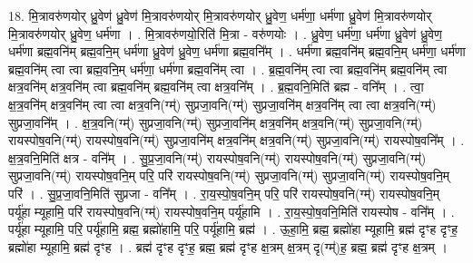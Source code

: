 \documentclass[17pt]{extarticle}
\begin{document}
18. मि॒त्रावरु॑णयोर् ध्रु॒वेण॑ ध्रु॒वेण॑ मि॒त्रावरु॑णयोर् मि॒त्रावरु॑णयोर् ध्रु॒वेण॒ धर्म॑णा॒ धर्म॑णा ध्रु॒वेण॑ मि॒त्रावरु॑णयोर् मि॒त्रावरु॑णयोर् ध्रु॒वेण॒ धर्म॑णा । . मि॒त्रावरु॑णयो॒रिति॑ मि॒त्रा - वरु॑णयोः । . ध्रु॒वेण॒ धर्म॑णा॒ धर्म॑णा ध्रु॒वेण॑ ध्रु॒वेण॒ धर्म॑णा ब्रह्म॒वनि॑म् ब्रह्म॒वनि॒म् धर्म॑णा ध्रु॒वेण॑ ध्रु॒वेण॒ धर्म॑णा ब्रह्म॒वनि᳚म् । . धर्म॑णा ब्रह्म॒वनि॑म् ब्रह्म॒वनि॒म् धर्म॑णा॒ धर्म॑णा ब्रह्म॒वनि॑म् त्वा त्वा ब्रह्म॒वनि॒म् धर्म॑णा॒ धर्म॑णा ब्रह्म॒वनि॑म् त्वा । . ब्र॒ह्म॒वनि॑म् त्वा त्वा ब्रह्म॒वनि॑म् ब्रह्म॒वनि॑म् त्वा क्षत्र॒वनि॑म् क्षत्र॒वनि॑म् त्वा ब्रह्म॒वनि॑म् ब्रह्म॒वनि॑म् त्वा क्षत्र॒वनि᳚म् । . ब्र॒ह्म॒वनि॒मिति॑ ब्रह्म - वनि᳚म् । . त्वा॒ क्ष॒त्र॒वनि॑म् क्षत्र॒वनि॑म् त्वा त्वा क्षत्र॒वनि(ग्म्॑) सुप्रजा॒वनि(ग्म्॑) सुप्रजा॒वनि॑म् क्षत्र॒वनि॑म् त्वा त्वा क्षत्र॒वनि(ग्म्॑) सुप्रजा॒वनि᳚म् । . क्ष॒त्र॒वनि(ग्म्॑) सुप्रजा॒वनि(ग्म्॑) सुप्रजा॒वनि॑म् क्षत्र॒वनि॑म् क्षत्र॒वनि(ग्म्॑) सुप्रजा॒वनि(ग्म्॑) रायस्पोष॒वनि(ग्म्॑) रायस्पोष॒वनि(ग्म्॑) सुप्रजा॒वनि॑म् क्षत्र॒वनि॑म् क्षत्र॒वनि(ग्म्॑) सुप्रजा॒वनि(ग्म्॑) रायस्पोष॒वनि᳚म् । . क्ष॒त्र॒वनि॒मिति॑ क्षत्र - वनि᳚म् । . सु॒प्र॒जा॒वनि(ग्म्॑) रायस्पोष॒वनि(ग्म्॑) रायस्पोष॒वनि(ग्म्॑) सुप्रजा॒वनि(ग्म्॑) सुप्रजा॒वनि(ग्म्॑) रायस्पोष॒वनि॒म् परि॒ परि॑ रायस्पोष॒वनि(ग्म्॑) सुप्रजा॒वनि(ग्म्॑) सुप्रजा॒वनि(ग्म्॑) रायस्पोष॒वनि॒म् परि॑ । . सु॒प्र॒जा॒वनि॒मिति॑ सुप्रजा - वनि᳚म् । . रा॒य॒स्पो॒ष॒वनि॒म् परि॒ परि॑ रायस्पोष॒वनि(ग्म्॑) रायस्पोष॒वनि॒म् पर्यू॑हा म्यूहामि॒ परि॑ रायस्पोष॒वनि(ग्म्॑) रायस्पोष॒वनि॒म् पर्यू॑हामि । . रा॒य॒स्पो॒ष॒वनि॒मिति॑ रायस्पोष - वनि᳚म् । . पर्यू॑हा म्यूहामि॒ परि॒ पर्यू॑हामि॒ ब्रह्म॒ ब्रह्मो॑हामि॒ परि॒ पर्यू॑हामि॒ ब्रह्म॑ । . ऊ॒हा॒मि॒ ब्रह्म॒ ब्रह्मो॑हा म्यूहामि॒ ब्रह्म॑ दृꣳह दृꣳह॒ ब्रह्मो॑हा म्यूहामि॒ ब्रह्म॑ दृꣳह । . ब्रह्म॑ दृꣳह दृꣳह॒ ब्रह्म॒ ब्रह्म॑ दृꣳह क्ष॒त्रम् क्ष॒त्रम् दृ(ग्म्॑)ह॒ ब्रह्म॒ ब्रह्म॑ दृꣳह क्ष॒त्रम् । \newline
\end{document}

